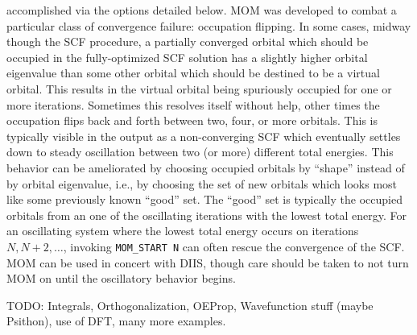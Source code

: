 accomplished via the options detailed below. MOM was developed to combat a
particular class of convergence failure: occupation flipping. In some cases,
midway though the SCF procedure, a partially converged orbital which should be
occupied in the fully-optimized SCF solution has a slightly higher orbital
eigenvalue than some other orbital which should be destined to be a virtual
orbital. This results in the virtual orbital being spuriously occupied for one
or more iterations. Sometimes this resolves itself without help, other times the
occupation flips back and forth between two, four, or more orbitals. This is
typically visible in the output as a non-converging SCF which eventually settles
down to steady oscillation between two (or more) different total energies. This
behavior can be ameliorated by choosing occupied orbitals by ``shape'' instead
of by orbital eigenvalue, i.e., by choosing the set of new orbitals which looks
most like some previously known ``good'' set.  The ``good'' set is typically the
occupied orbitals from an one of the oscillating iterations with the lowest
total energy. For an oscillating system where the lowest total energy occurs on
iterations $N,N+2,\ldots$, invoking \texttt{MOM\_START N} can often rescue the
convergence of the SCF. MOM can be used in concert with DIIS, though care should
be taken to not turn MOM on until the oscillatory behavior begins. 

TODO: Integrals, Orthogonalization, OEProp, Wavefunction stuff (maybe Psithon),
use of DFT, many more examples.


